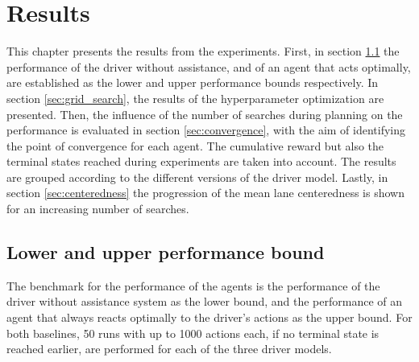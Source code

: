 \chapter{Results}
\label{ch:results}

This chapter presents the results from the experiments. First, in section \ref{sec:perf_bounds} the performance of the driver without assistance, and of an agent that acts optimally, are established as the lower and upper performance bounds respectively. In section \ref{sec:grid_search}, the results of the hyperparameter optimization are presented. Then, the influence of the number of searches during planning  on the performance is evaluated in section \ref{sec:convergence}, with the aim of identifying the point of convergence for each agent. The cumulative reward but also the terminal states reached during experiments are taken into account. The results are grouped according to the different versions of the driver model. Lastly, in section \ref{sec:centeredness} the progression of the mean lane centeredness is shown for an increasing number of searches.




\section{Lower and upper performance bound}
\label{sec:perf_bounds}


The benchmark for the performance of the agents is the performance of the driver without assistance system as the lower bound, and the performance of an agent that always reacts optimally to the driver's actions as the upper bound. For both baselines, 50 runs with up to 1000 actions each, if no terminal state is reached earlier, are performed for each of the three driver models. 

